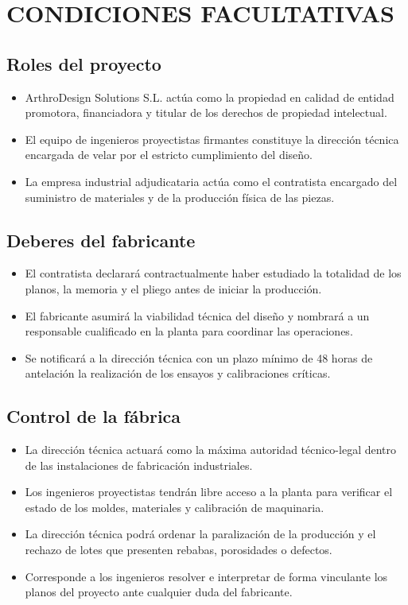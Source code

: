 \documentclass[11pt,a4paper]{article}
\begin{document}
\section{CONDICIONES FACULTATIVAS}

\subsection{Roles del proyecto}
\begin{itemize}
    \item ArthroDesign Solutions S.L. actúa como la propiedad en calidad de entidad promotora, financiadora y titular de los derechos de propiedad intelectual.
    \item El equipo de ingenieros proyectistas firmantes constituye la dirección técnica encargada de velar por el estricto cumplimiento del diseño.
    \item La empresa industrial adjudicataria actúa como el contratista encargado del suministro de materiales y de la producción física de las piezas.
\end{itemize}

\subsection{Deberes del fabricante}
\begin{itemize}
    \item El contratista declarará contractualmente haber estudiado la totalidad de los planos, la memoria y el pliego antes de iniciar la producción.
    \item El fabricante asumirá la viabilidad técnica del diseño y nombrará a un responsable cualificado en la planta para coordinar las operaciones.
    \item Se notificará a la dirección técnica con un plazo mínimo de 48 horas de antelación la realización de los ensayos y calibraciones críticas.
\end{itemize}

\subsection{Control de la fábrica}
\begin{itemize}
    \item La dirección técnica actuará como la máxima autoridad técnico-legal dentro de las instalaciones de fabricación industriales.
    \item Los ingenieros proyectistas tendrán libre acceso a la planta para verificar el estado de los moldes, materiales y calibración de maquinaria.
    \item La dirección técnica podrá ordenar la paralización de la producción y el rechazo de lotes que presenten rebabas, porosidades o defectos.
    \item Corresponde a los ingenieros resolver e interpretar de forma vinculante los planos del proyecto ante cualquier duda del fabricante.
\end{itemize}
\end{document}

